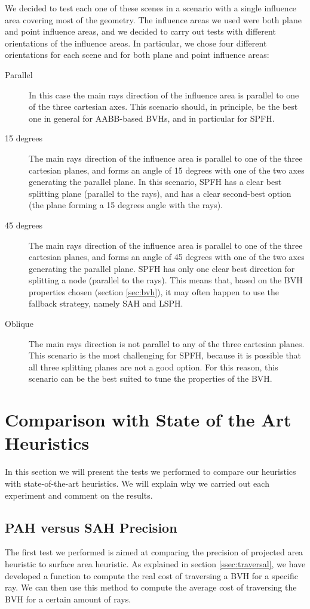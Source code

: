 \documentclass{PoliMi_MasterThesis}
\begin{document}
We decided to test each one of these scenes in a scenario with a single influence area covering most of the geometry. The influence areas we used were both plane and point influence areas, and we decided to carry out tests with different orientations of the influence areas. In particular, we chose four different orientations for each scene and for both plane and point influence areas:
\begin{description}
	\item[Parallel] In this case the main rays direction of the influence area is parallel to one of the three cartesian axes. This scenario should, in principle, be the best one in general for AABB-based BVHs, and in particular for SPFH.
	\item[15 degrees] The main rays direction of the influence area is parallel to one of the three cartesian planes, and forms an angle of 15 degrees with one of the two axes generating the parallel plane. In this scenario, SPFH has a clear best splitting plane (parallel to the rays), and has a clear second-best option (the plane forming a 15 degrees angle with the rays).
	\item[45 degrees] The main rays direction of the influence area is parallel to one of the three cartesian planes, and forms an angle of 45 degrees with one of the two axes generating the parallel plane. SPFH has only one clear best direction for splitting a node (parallel to the rays). This means that, based on the BVH properties chosen (section \ref{sec:bvh}), it may often happen to use the fallback strategy, namely SAH and LSPH.
	\item[Oblique] The main rays direction is not parallel to any of the three cartesian planes. This scenario is the most challenging for SPFH, because it is possible that all three splitting planes are not a good option. For this reason, this scenario can be the best suited to tune the properties of the BVH.
\end{description}

\section{Comparison with State of the Art Heuristics} \label{sec:comparison_with_state_of_the_art_heuristics}
In this section we will present the tests we performed to compare our heuristics with state-of-the-art heuristics. We will explain why we carried out each experiment and comment on the results.

\subsection{PAH versus SAH Precision} \label{ssec:pah_vs_sah_precision}
The first test we performed is aimed at comparing the precision of projected area heuristic to surface area heuristic. As explained in section \ref{ssec:traversal}, we have developed a function to compute the real cost of traversing a BVH for a specific ray. We can then use this method to compute the average cost of traversing the BVH for a certain amount of rays. 
\end{document}
